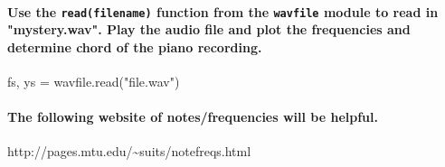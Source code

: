 \documentclass[11pt]{article}
\newenvironment{Shaded}{}{}
\newcommand{\StringTok}[1]{\textcolor[rgb]{0.25,0.44,0.63}{{#1}}}
\newcommand{\NormalTok}[1]{{#1}}
\newcommand{\OperatorTok}[1]{\textcolor[rgb]{0.40,0.40,0.40}{{#1}}}
\begin{document}
    \paragraph{\texorpdfstring{Use the \texttt{read(filename)} function from
the \texttt{wavfile} module to read in "mystery.wav". Play the audio
file and plot the frequencies and determine chord of the piano
recording.}{Use the read(filename) function from the wavfile module to read in "mystery.wav". Play the audio file and plot the frequencies and determine chord of the piano recording.}}\label{use-the-readfilename-function-from-the-wavfile-module-to-read-in-mystery.wav.-play-the-audio-file-and-plot-the-frequencies-and-determine-chord-of-the-piano-recording.}

\begin{Shaded}
\begin{Highlighting}[]
\NormalTok{fs, ys }\OperatorTok{=}\NormalTok{ wavfile.read(}\StringTok{"file.wav"}\NormalTok{)}
\end{Highlighting}
\end{Shaded}

\paragraph{The following website of notes/frequencies will be
helpful.}\label{the-following-website-of-notesfrequencies-will-be-helpful.}

http://pages.mtu.edu/\textasciitilde{}suits/notefreqs.html


    
    
    
    
\end{document}
